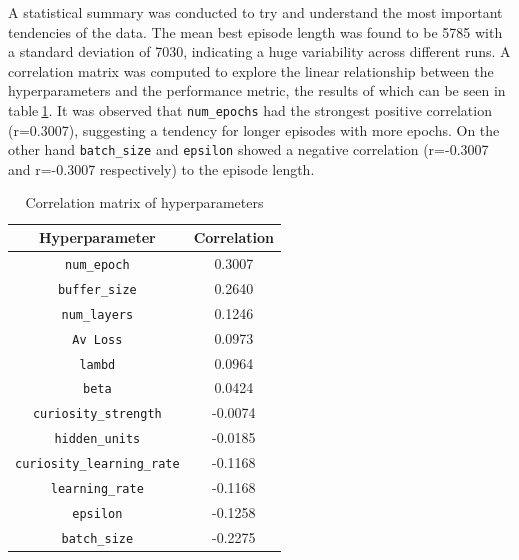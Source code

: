 A statistical summary was conducted to try and understand the most important tendencies of the data. The mean best episode length was found to be 5785 with a standard deviation of 7030, indicating a huge variability across different runs. A correlation matrix was computed to explore the linear relationship between the hyperparameters and the performance metric, the results of which can be seen in table$~$\ref{corr_matrix}. It was observed that \texttt{num\_epochs} had the strongest positive correlation (r=0.3007), suggesting a tendency for longer episodes with more epochs. On the other hand \texttt{batch\_size} and \texttt{epsilon} showed a negative correlation (r=-0.3007 and r=-0.3007 respectively) to the episode length.

\begin{table}[!htb]
    \centering
    \begin{tabular}{c|c}
        \textbf{Hyperparameter} & \textbf{Correlation} \\
        \hline

        \texttt{num\_epoch} & 0.3007 \\
        \texttt{buffer\_size} & 0.2640 \\
        \texttt{num\_layers} & 0.1246 \\
        \texttt{Av Loss} & 0.0973 \\
        \texttt{lambd} & 0.0964 \\
        \texttt{beta} & 0.0424 \\
        \texttt{curiosity\_strength} & -0.0074 \\
        \texttt{hidden\_units} & -0.0185 \\
        \texttt{curiosity\_learning\_rate} & -0.1168 \\
        \texttt{learning\_rate} & -0.1168 \\
        \texttt{epsilon} & -0.1258 \\
        \texttt{batch\_size} & -0.2275 \\
        \bottomrule
    \end{tabular}
    \caption{Correlation matrix of hyperparameters}\label{corr_matrix}
\end{table}

